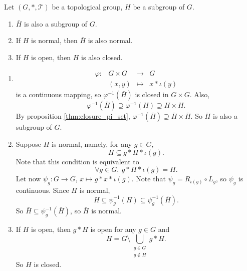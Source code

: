 \begin{propositionenv}\label{prop:5.2.12}
    Let $(G,*,\mathscr{T})$ be a topological group,
    $H$ be a subgroup of $G$.
    \begin{enumerate}
        \item $\bar{H}$ is also a subgroup of $G$.
        \item If $H$ is normal, then $\bar{H}$ is also normal.
        \item If $H$ is open, then $H$ is also closed.
    \end{enumerate}
\end{propositionenv}
\begin{proofenv}
    \quad
    \begin{enumerate}
        \item 
            $$\begin{array}{rrcl}
                \varphi : & G \times G & \longrightarrow & G \\
                & (x,y) & \longmapsto & x * \iota(y)
            \end{array}$$
            is a continuous mapping, so $\varphi^{-1}(\bar{H})$ is closed in $G \times G$.
            Also, 
            $$ \varphi^{-1}(\bar{H}) \supseteq \varphi^{-1}(H) \supseteq H \times H.$$
            By proposition \ref{thm:closure_pi_set}, $\varphi^{-1}(\bar{H}) \supseteq \bar{H} \times \bar{H}$.
            So $\bar{H}$ is also a subgroup of $G$.
        \item Suppose $H$ is normal, namely, for any $g \in G$,
            $$H \subseteq g * H * \iota(g).$$
            Note that this condition is equivalent to
            $$\forall g \in G,\ g * H * \iota(g) = H.$$
            Let now $\psi_g : G \rightarrow G$, $x \mapsto g * x* \iota(g)$.
            Note that $\psi_{g} = R_{\iota(g)} \circ L_g$, so $\psi_{g}$ is continuous.
            Since $H$ is normal,
            $$ H \subseteq \psi^{-1}_{g} (H) \subseteq \psi^{-1}_{g} (\bar{H}).$$
            So $\bar{H} \subseteq \psi^{-1}_{g} (\bar{H})$, so $\bar{H}$ is normal.
        \item If $H$ is open, then $g * H$ is open for any $g \in G$ and
            $$ H = G \setminus \bigcup_{\substack{g \in G\\g \notin H}} g * H.$$
            So $H$ is closed.
    \end{enumerate}
\end{proofenv}

